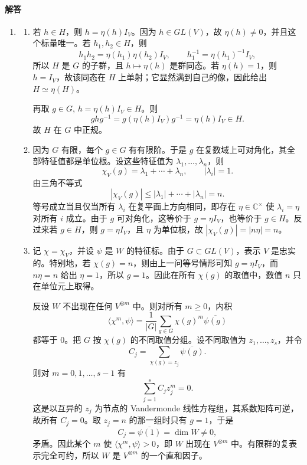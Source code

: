 \documentclass[UTF8,12pt]{ctexart}
\begin{document}
\paragraph{解答}
\begin{enumerate}[label=\textbf{\arabic*.},leftmargin=2.2em]
\item
\begin{enumerate}[label=\textbf{(\alph*)},leftmargin=2.4em]
\item 若 \(h\in H\)，则 \(h=\eta(h)I_V\)。因为 \(h\in GL(V)\)，故 \(\eta(h)\ne0\)，并且这个标量唯一。若 \(h_1,h_2\in H\)，则
\[
h_1h_2=\eta(h_1)\eta(h_2)I_V,\qquad
h_1^{-1}=\eta(h_1)^{-1}I_V,
\]
所以 \(H\) 是 \(G\) 的子群，且 \(h\mapsto\eta(h)\) 是群同态。若 \(\eta(h)=1\)，则 \(h=I_V\)，故该同态在 \(H\) 上单射；它显然满到自己的像，因此给出 \(H\simeq\eta(H)\)。

再取 \(g\in G\), \(h=\eta(h)I_V\in H\)。则
\[
ghg^{-1}=g(\eta(h)I_V)g^{-1}=\eta(h)I_V\in H.
\]
故 \(H\) 在 \(G\) 中正规。

\item 因为 \(G\) 有限，每个 \(g\in G\) 有有限阶。于是 \(g\) 在复数域上可对角化，其全部特征值都是单位根。设这些特征值为 \(\lambda_1,\ldots,\lambda_n\)，则
\[
\chi_V(g)=\lambda_1+\cdots+\lambda_n,\qquad |\lambda_i|=1.
\]
由三角不等式
\[
|\chi_V(g)|\le |\lambda_1|+\cdots+|\lambda_n|=n.
\]
等号成立当且仅当所有 \(\lambda_i\) 在复平面上方向相同，即存在 \(\eta\in\mathbb C^\times\) 使 \(\lambda_i=\eta\) 对所有 \(i\) 成立。由于 \(g\) 可对角化，这等价于 \(g=\eta I_V\)，也等价于 \(g\in H\)。反过来若 \(g\in H\)，则 \(g=\eta I_V\)，且 \(\eta\) 为单位根，故 \(|\chi_V(g)|=|n\eta|=n\)。

\item 记 \(\chi=\chi_V\)，并设 \(\psi\) 是 \(W\) 的特征标。由于 \(G\subset GL(V)\)，表示 \(V\) 是忠实的。特别地，若 \(\chi(g)=n\)，则由上一问等号情形可知 \(g=\eta I_V\)，而 \(n\eta=n\) 给出 \(\eta=1\)，所以 \(g=1\)。因此在所有 \(\chi(g)\) 的取值中，数值 \(n\) 只在单位元上取得。

反设 \(W\) 不出现在任何 \(V^{\otimes m}\) 中。则对所有 \(m\ge0\)，内积
\[
\langle \chi^m,\psi\rangle
=\frac1{|G|}\sum_{g\in G}\chi(g)^m\overline{\psi(g)}
\]
都等于 \(0\)。把 \(G\) 按 \(\chi(g)\) 的不同取值分组。设不同取值为 \(z_1,\ldots,z_s\)，并令
\[
C_j=\sum_{\chi(g)=z_j}\overline{\psi(g)}.
\]
则对 \(m=0,1,\ldots,s-1\) 有
\[
\sum_{j=1}^s C_j z_j^m=0.
\]
这是以互异的 \(z_j\) 为节点的 Vandermonde 线性方程组，其系数矩阵可逆，故所有 \(C_j=0\)。取 \(z_j=n\) 的那一组时只有 \(g=1\)，于是
\[
C_j=\overline{\psi(1)}=\dim W\ne0,
\]
矛盾。因此某个 \(m\) 使 \(\langle\chi^m,\psi\rangle>0\)，即 \(W\) 出现在 \(V^{\otimes m}\) 中。有限群的复表示完全可约，所以 \(W\) 是 \(V^{\otimes m}\) 的一个直和因子。
\end{enumerate}


\end{enumerate}
\end{document}
